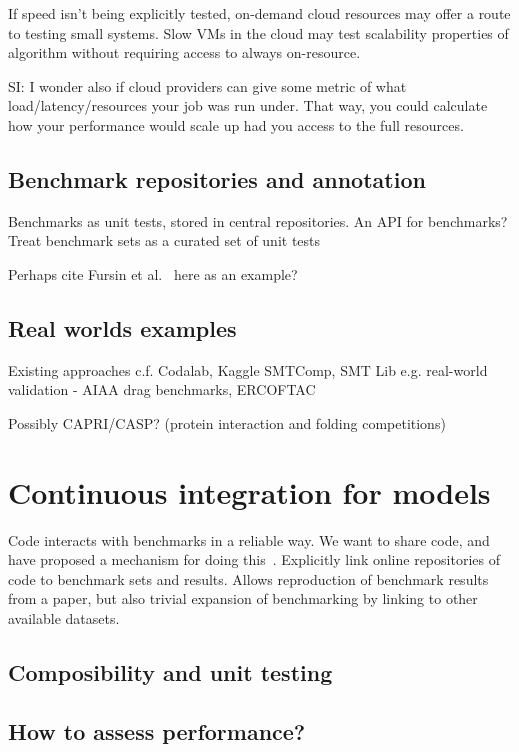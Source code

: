 \documentclass[conference]{IEEEtran}
\begin{document}
If speed isn't being explicitly tested, on-demand cloud resources 
may offer a route to testing small systems. Slow VMs in the cloud
may test scalability properties of algorithm without requiring access
to always on-resource.

SI: I wonder also if cloud providers can give some metric of what
load/latency/resources your job was run under.  That way, you could
calculate how your performance would scale up had you access to the
full resources. 


\subsection{Benchmark repositories and annotation}

Benchmarks as unit tests, stored in central repositories. An API 
for benchmarks? Treat benchmark sets as a curated set of unit tests

Perhaps cite Fursin et al.~\cite{fursin-et-al:2014} here as an example?

\subsection{Real worlds examples}

Existing approaches
	c.f. Codalab, Kaggle
	SMTComp, SMT Lib
	e.g. real-world validation - AIAA drag benchmarks, ERCOFTAC

	Possibly CAPRI/CASP? (protein interaction and folding competitions)


\section{Continuous integration for models}

Code interacts with benchmarks in a reliable way. We want to share
code, and have proposed a mechanism for doing this~\cite{crick-et-al_wssspe2}.
Explicitly link online repositories of code to benchmark sets and
results. Allows reproduction of benchmark results from a paper, 
but also trivial expansion of benchmarking by linking to other 
available datasets.

\subsection{Composibility and unit testing}



\subsection{How to assess performance?}
\end{document}
